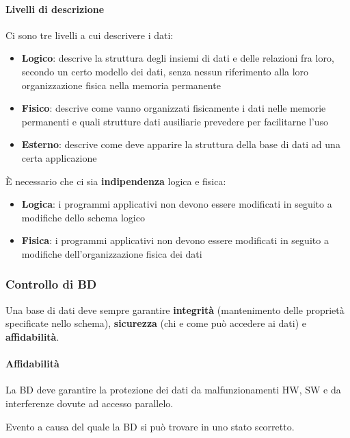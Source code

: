 \paragraph{Livelli di descrizione} Ci sono tre livelli a cui descrivere i dati:
\begin{itemize}
	\item \textbf{Logico}: descrive la struttura degli insiemi di dati e delle relazioni fra loro, secondo un certo modello dei dati, senza nessun riferimento alla loro organizzazione fisica nella memoria permanente
	\item \textbf{Fisico}: descrive come vanno organizzati fisicamente i dati nelle memorie	permanenti e quali strutture dati ausiliarie prevedere per facilitarne l’uso
	\item \textbf{Esterno}: descrive come deve apparire la struttura della base di dati ad una certa applicazione
\end{itemize}
È necessario che ci sia \textbf{indipendenza} logica e fisica:
\begin{itemize}
	\item \textbf{Logica}: i programmi applicativi non devono essere modificati in seguito a modifiche dello schema logico
	\item \textbf{Fisica}: i programmi applicativi non devono essere modificati in seguito a modifiche dell’organizzazione fisica dei dati
\end{itemize}

\newpage
\subsubsection{Controllo di BD}
Una base di dati deve sempre garantire \textbf{integrità} (mantenimento delle proprietà specificate nello schema), \textbf{sicurezza} (chi e come può accedere ai dati) e \textbf{affidabilità}.

\paragraph{Affidabilità}
La BD deve garantire la protezione dei dati da malfunzionamenti HW, SW e da interferenze dovute ad accesso parallelo. 

\begin{definition}[Malfunzionamento]
	Evento a causa del quale la BD si può trovare in uno stato scorretto.
\end{definition}

